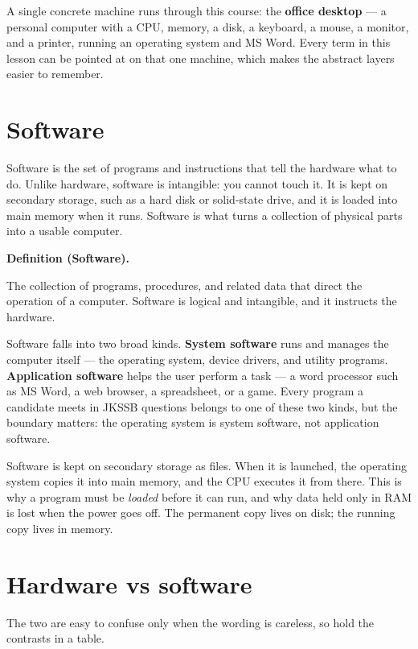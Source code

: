 \documentclass[11pt]{article}
\newenvironment{definitionbox}[1]{%
  \par\noindent\textbf{Definition (#1).}\ \itshape
}{\par\vspace{0.3em}}
\begin{document}
A single concrete machine runs through this course: the \textbf{office
desktop} --- a personal computer with a CPU, memory, a disk, a keyboard, a
mouse, a monitor, and a printer, running an operating system and MS Word.
Every term in this lesson can be pointed at on that one machine, which makes
the abstract layers easier to remember.

\section{Software}
Software is the set of programs and instructions that tell the hardware what
to do. Unlike hardware, software is intangible: you cannot touch it. It is
kept on secondary storage, such as a hard disk or solid-state drive, and it
is loaded into main memory when it runs. Software is what turns a collection
of physical parts into a usable computer.

\begin{definitionbox}{Software}
The collection of programs, procedures, and related data that direct the
operation of a computer. Software is logical and intangible, and it instructs
the hardware.
\end{definitionbox}

Software falls into two broad kinds. \textbf{System software} runs and manages
the computer itself --- the operating system, device drivers, and utility
programs. \textbf{Application software} helps the user perform a task --- a
word processor such as MS Word, a web browser, a spreadsheet, or a game. Every
program a candidate meets in JKSSB questions belongs to one of these two
kinds, but the boundary matters: the operating system is system software, not
application software.

Software is kept on secondary storage as files. When it is launched, the
operating system copies it into main memory, and the CPU executes it from
there. This is why a program must be \emph{loaded} before it can run, and why
data held only in RAM is lost when the power goes off. The permanent copy
lives on disk; the running copy lives in memory.

\section{Hardware vs software}
The two are easy to confuse only when the wording is careless, so hold the
contrasts in a table.
\end{document}
